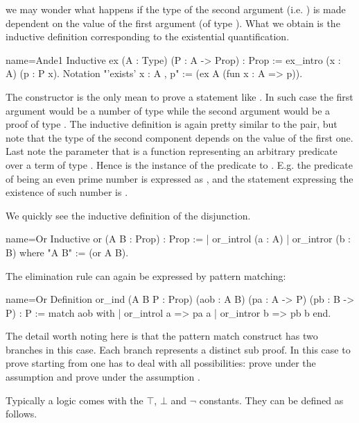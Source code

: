 we may wonder what happens if the type of the second argument (i.e. ) is
made dependent on the value of the first argument (of type ).
What we obtain is the inductive definition corresponding to the
existential quantification.

\begin{coq}{name=Ande1}{}
Inductive ex (A : Type) (P : A -> Prop) : Prop :=
  ex_intro (x : A) (p : P x).
Notation "'exists' x : A , p" := (ex A (fun x : A => p)).
\end{coq}

The  constructor is the only mean to prove a statement like
.  In such case the first argument would be a number
 of type  while the second argument would be a proof  of type
.  The  inductive definition is again pretty similar to the
pair, but note that the type of the second component depends on the value of
the first one.  Last note the parameter  that is a function
representing an arbitrary predicate over a term of
type .  Hence  is the instance of the predicate to .  E.g.
the predicate of being an even prime number is expressed as
, and the statement expressing the
existence of such number is
.

We quickly see the inductive definition of the disjunction.

\begin{coq}{name=Or}{}
Inductive or (A B : Prop) : Prop :=
  | or_introl (a : A)
  | or_intror (b : B)
where "A \/ B" := (or A B).
\end{coq}

The elimination rule can again be expressed by pattern matching:

\begin{coq}{name=Or}{}
Definition or_ind (A B P : Prop)
  (aob : A \/ B) (pa : A -> P) (pb : B -> P) : P :=
  match aob with
  | or_introl a => pa a
  | or_intror b => pb b
  end.
\end{coq}

The detail worth noting here is that the pattern match construct has two
branches in this case.  Each branch represents a distinct sub proof.  In this
case to prove  starting from  one has to deal with all
possibilities: prove  under the assumption  and prove 
under the assumption .

Typically a logic comes with the $\top$, $\bot$ and $\neg$ constants.
They can be defined as follows.

